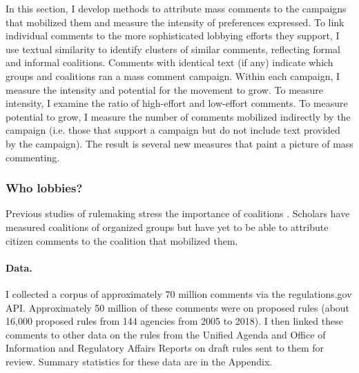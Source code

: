 In this section, I develop methods to attribute mass comments to the campaigns that mobilized them and measure the intensity of preferences expressed. 
To link individual comments to the more sophisticated lobbying efforts they support, I use textual similarity to identify clusters of similar comments, reflecting formal and informal coalitions. Comments with identical text (if any) indicate which groups and coalitions ran a mass comment campaign. Within each campaign, I measure the intensity and potential for the movement to grow. To measure intensity, I examine the ratio of high-effort and low-effort comments. To measure potential to grow, I measure the number of comments mobilized indirectly by the campaign (i.e. those that support a campaign but do not include text provided by the campaign).
The result is several new measures that paint a picture of mass commenting. 

\subsubsection{Who lobbies?}
Previous studies of rulemaking stress the importance of coalitions \citep{Yackee2006JOP}. Scholars have measured coalitions of organized groups but have yet to be able to attribute citizen comments to the coalition that mobilized them.


\paragraph{Data.} I collected a corpus of approximately 70 million comments via the regulations.gov API. Approximately 50 million of these comments were on proposed rules (about 16,000 proposed rules from 144 agencies from 2005 to 2018). I then linked these comments to other data on the rules from the Unified Agenda and Office of Information and Regulatory Affairs Reports on draft rules sent to them for review. Summary statistics for these data are in the Appendix.

